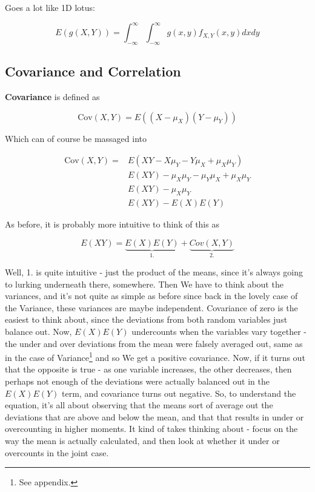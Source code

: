 \documentclass{article}
\begin{document}
		Goes a lot like 1D lotus:
		
		\[ E(g(X, Y)) = \int^\infty_{-\infty} \int^\infty_{-\infty} g(x, y) f_{X, Y}(x, y) dx dy \]
		
	\subsection{Covariance and Correlation}
	
		\textbf{Covariance} is defined as
		
		\[ \text{Cov}(X, Y) = E((X - \mu_X)(Y - \mu_Y))  \]
		
		Which can of course be massaged into
		
		\begin{align*}
			\text{Cov}(X, Y) =& E(XY - X\mu_Y - Y\mu_X + \mu_X\mu_Y) \\
			& E(XY) - \mu_X\mu_Y - \mu_Y\mu_X + \mu_X\mu_Y \\
			& E(XY) - \mu_X\mu_Y \\
			& E(XY) - E(X)E(Y)
		\end{align*}
		
		As before, it is probably more intuitive to think of this as
		
		\[ E(XY) = \underbrace{E(X)E(Y)}_{1.} + \underbrace{Cov(X, Y)}_{2.} \]
		
		Well, 1. is quite intuitive - just the product of the means, since it's always going to lurking underneath there, somewhere. Then We have to think about the variances, and it's not quite as simple as before since back in the lovely case of the Variance, these variances are maybe independent.  Covariance of zero is the easiest to think about, since the deviations from both random variables just balance out. Now, $E(X)E(Y)$ undercounts when the variables vary together - the under and over deviations from the mean were falsely averaged out, same as in the case of Variance\footnote{See appendix.} and so We get a positive covariance. Now, if it turns out that the opposite is true - as one variable increases, the other decreases, then perhaps not enough of the deviations were actually balanced out in the $E(X)E(Y)$ term, and covariance turns out negative. So, to understand the equation, it's all about observing that the means sort of average out the deviations that are above and below the mean, and that that results in under or overcounting in higher moments. It kind of takes thinking about - focus on the way the mean is actually calculated, and then look at whether it under or overcounts in the joint case.
\end{document}
